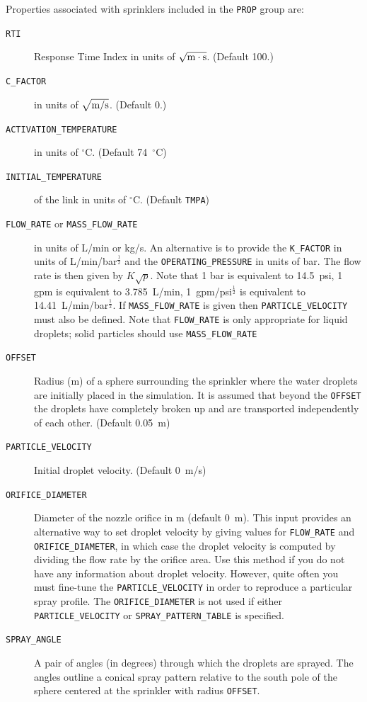 \documentclass[11pt]{book}
\newcommand{\ct}{\tt\small}
\newcommand{\ha}{\frac{1}{2}}
\begin{document}
Properties associated with sprinklers included in the {\ct PROP} group are:
\begin{description}
\item[{\ct RTI}] Response Time Index in units of $\sqrt{\hbox{m}\cdot \hbox{s}}$. (Default 100.)
\item[{\ct C\_FACTOR}] in units of $\sqrt{\hbox{m/s}}$. (Default 0.)
\item[{\ct ACTIVATION\_TEMPERATURE}] in units of $^\circ$C. (Default 74~$^\circ$C)
\item[{\ct INITIAL\_TEMPERATURE}] of the link in units of $^\circ$C. (Default {\ct TMPA})
\item[{\ct FLOW\_RATE} or {\ct MASS\_FLOW\_RATE}] in units of L/min or kg/s.
An alternative is to provide the {\ct K\_FACTOR} in units of L/min/bar$^\ha$ and the
{\ct OPERATING\_PRESSURE} in units of bar.
The flow rate is then given by $K \sqrt{p}$. Note that 1 bar is equivalent to
14.5~psi, 1 gpm is equivalent to 3.785~L/min, 1~gpm/psi$^\ha$ is
equivalent to 14.41~L/min/bar$^\ha$.  If {\ct MASS\_FLOW\_RATE} is given then {\ct PARTICLE\_VELOCITY} must also be defined.
Note that {\ct FLOW\_RATE} is only appropriate for liquid droplets; solid particles should use {\ct MASS\_FLOW\_RATE}
\item[{\ct OFFSET}] Radius (m) of a sphere surrounding the
sprinkler where the water droplets are initially placed in the simulation. It is assumed that beyond the {\ct OFFSET} the droplets have completely broken
up and are transported independently of each other. (Default 0.05~m)
\item[{\ct PARTICLE\_VELOCITY}]  Initial droplet velocity. (Default 0~m/s)
\item[{\ct ORIFICE\_DIAMETER}] Diameter of the nozzle orifice in m (default 0~m). This input provides an alternative way to set droplet velocity
by giving values for {\ct FLOW\_RATE} and {\ct ORIFICE\_DIAMETER}, in which case the droplet velocity is computed by dividing the
flow rate by the orifice area. Use this method if you do not have any information about droplet velocity. However, quite often
you must fine-tune the {\ct PARTICLE\_VELOCITY} in order to reproduce a particular spray profile.
The {\ct ORIFICE\_DIAMETER} is not used if either {\ct PARTICLE\_VELOCITY} or {\ct SPRAY\_PATTERN\_TABLE} is specified.
\item[{\ct SPRAY\_ANGLE}] A pair of angles (in degrees) through which the droplets are sprayed.
The angles outline a conical spray pattern relative to the
south pole of the sphere centered at the sprinkler with radius {\ct OFFSET}.

\end{description}
\end{document}
